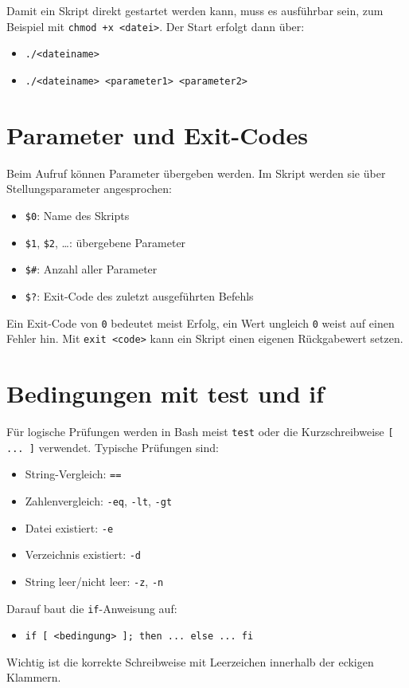 \documentclass[11pt, oneside, numbers=nönddot]{scrbook}
\begin{document}
Damit ein Skript direkt gestartet werden kann, muss es ausführbar sein, zum Beispiel mit \texttt{chmod +x <datei>}. Der Start erfolgt dann über:
\begin{itemize}
\item \texttt{./<dateiname>}
\item \texttt{./<dateiname> <parameter1> <parameter2>}
\end{itemize}

\section{Parameter und Exit-Codes}
Beim Aufruf können Parameter übergeben werden. Im Skript werden sie über Stellungsparameter angesprochen:
\begin{itemize}
\item \texttt{\$0}: Name des Skripts
\item \texttt{\$1}, \texttt{\$2}, \dots: übergebene Parameter
\item \texttt{\$\#}: Anzahl aller Parameter
\item \texttt{\$?}: Exit-Code des zuletzt ausgeführten Befehls
\end{itemize}

Ein Exit-Code von \texttt{0} bedeutet meist Erfolg, ein Wert ungleich \texttt{0} weist auf einen Fehler hin. Mit \texttt{exit <code>} kann ein Skript einen eigenen Rückgabewert setzen.

\section{Bedingungen mit test und if}
Für logische Prüfungen werden in Bash meist \texttt{test} oder die Kurzschreibweise \texttt{[ ... ]} verwendet. Typische Prüfungen sind:
\begin{itemize}
\item String-Vergleich: \texttt{==}
\item Zahlenvergleich: \texttt{-eq}, \texttt{-lt}, \texttt{-gt}
\item Datei existiert: \texttt{-e}
\item Verzeichnis existiert: \texttt{-d}
\item String leer/nicht leer: \texttt{-z}, \texttt{-n}
\end{itemize}

Darauf baut die \texttt{if}-Anweisung auf:
\begin{itemize}
\item \texttt{if [ <bedingung> ]; then ... else ... fi}
\end{itemize}
Wichtig ist die korrekte Schreibweise mit Leerzeichen innerhalb der eckigen Klammern.
\end{document}
